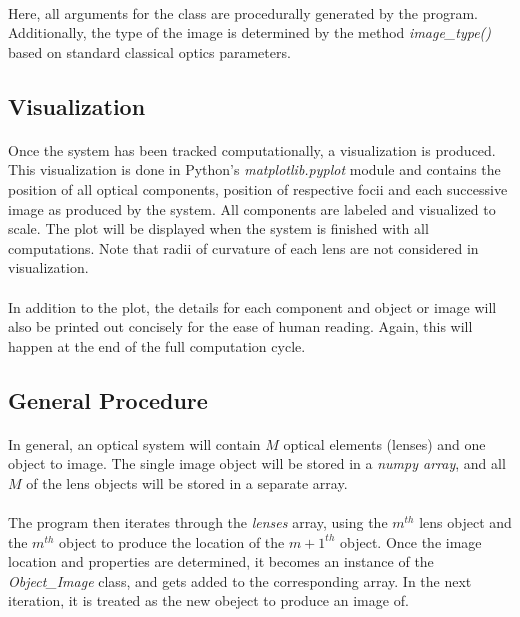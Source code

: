 \documentclass[12pt,letterpaper]{article}
\begin{document}
\paragraph*{}Here, all arguments for the class are procedurally generated by the program. Additionally, the type of the image is determined by the method \textit{image\_type()} based on standard classical optics parameters.


\subsection{Visualization}
\paragraph*{}Once the system has been tracked computationally, a visualization is produced. This visualization is done in Python's \textit{matplotlib.pyplot} module and contains the position of all optical components, position of respective focii and each successive image as produced by the system. All components are labeled and visualized to scale. The plot will be displayed when the system is finished with all computations. Note that radii of curvature of each lens are not considered in visualization.
\paragraph*{}In addition to the plot, the details for each component and object or image will also be printed out concisely for the ease of human reading. Again, this will happen at the end of the full computation cycle.


\subsection{General Procedure}
\paragraph*{}In general, an optical system will contain $M$ optical elements (lenses) and one object to image. The single image object will be stored in a \textit{numpy array}, and all $M$ of the lens objects will be stored in a separate array.
\paragraph*{}The program then iterates through the \textit{lenses} array, using the $m^{th}$ lens object and the $m^{th}$ object to produce the location of the $m+1^{th}$ object. Once the image location and properties are determined, it becomes an instance of the \textit{Object\_Image} class, and gets added to the corresponding array. In the next iteration, it is treated as the new obeject to produce an image of. 
\end{document}
